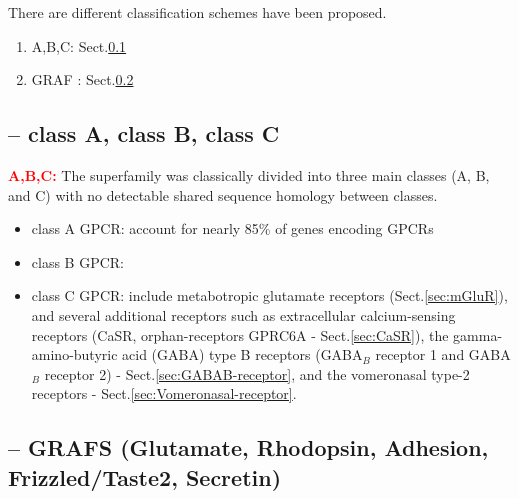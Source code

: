 There are different classification schemes have been proposed.
\begin{enumerate}
  \item A,B,C: Sect.\ref{sec:GPCR-classification-1}
  
  \item GRAF : Sect.\ref{sec:GPCR-classification-2}
\end{enumerate}

\subsection{-- class A, class B, class C}
\label{sec:GPCR-classification-1}
\label{sec:GPCR-class-A}
\label{sec:GPCR-class-B}
\label{sec:GPCR-class-C}

\textcolor{red}{\bf A,B,C:} The superfamily was classically divided into three
main classes (A, B, and C) with no detectable shared sequence homology between
classes.

\begin{itemize}

  \item class A GPCR: account for nearly 85\% of genes encoding GPCRs
  
  \item class B GPCR:
  
  \item class C GPCR: include metabotropic glutamate receptors
  (Sect.\ref{sec:mGluR}), and several additional receptors such as extracellular
  calcium-sensing receptors (CaSR, orphan-receptors GPRC6A -
  Sect.\ref{sec:CaSR}), the gamma-amino-butyric acid (GABA) type B receptors
  (GABA$_B$ receptor 1 and GABA$_B$ receptor 2) - Sect.\ref{sec:GABAB-receptor},
  and the vomeronasal type-2 receptors - Sect.\ref{sec:Vomeronasal-receptor}.
  

\end{itemize}

\subsection{-- GRAFS (Glutamate, Rhodopsin, Adhesion, Frizzled/Taste2,
Secretin)}
\label{sec:GPCR-classification-2}
\label{sec:GPCR-GRAFS}

